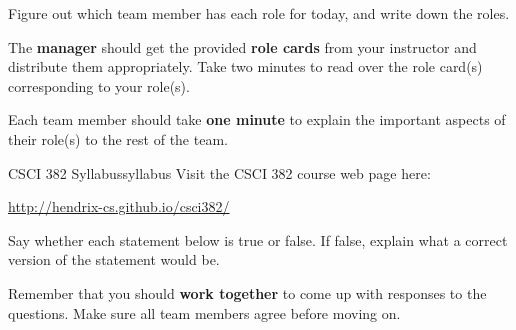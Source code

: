\documentclass{tufte-handout}
\begin{document}
\begin{questions}
\item Figure out which team member has each role for today, and write
  down the roles.
\item The \textbf{manager} should get the provided \textbf{role cards}
  from your instructor and distribute them appropriately.  Take two
  minutes to read over the role card(s) corresponding to your role(s).
\item Each team member should take \textbf{one minute} to explain the
  important aspects of their role(s) to the rest of the team.
\end{questions}

\newpage
\begin{model*}{CSCI 382 Syllabus}{syllabus}
  Visit the CSCI 382 course web page here: \bigskip

  \url{http://hendrix-cs.github.io/csci382/}
\end{model*}

Say whether each statement below is true or false.  If false, explain
what a correct version of the statement would be.

Remember that you should \textbf{work together} to come up with
responses to the questions.  Make sure all team members agree before
moving on.
\end{document}
